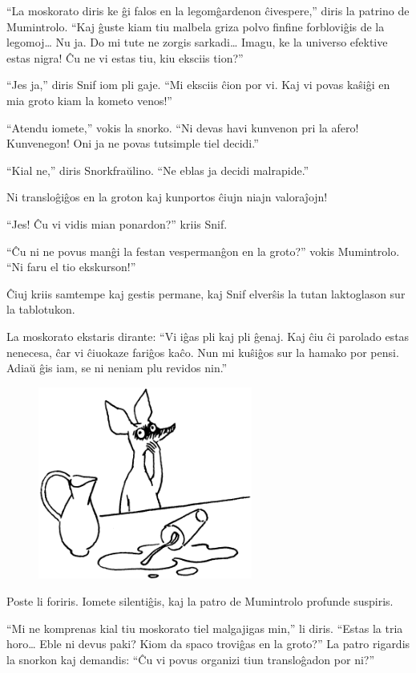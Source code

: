 ``La moskorato diris ke ĝi falos en la legomĝardenon ĉivespere,'' diris la patrino de Mumintrolo. ``Kaj ĝuste kiam tiu malbela griza polvo finfine forbloviĝis de la legomoj{\ldots} Nu ja. Do mi tute ne zorgis sarkadi{\ldots} Imagu, ke la universo efektive estas nigra! Ĉu ne vi estas tiu, kiu eksciis tion?''

``Jes ja,'' diris Snif iom pli gaje. ``Mi eksciis ĉion por vi. Kaj vi povas kaŝiĝi en mia groto kiam la kometo venos!''

``Atendu iomete,'' vokis la snorko. ``Ni devas havi kunvenon pri la afero! Kunvenegon! Oni ja ne povas tutsimple tiel decidi.''

``Kial ne,'' diris Snorkfraŭlino. ``Ne eblas ja decidi malrapide.''

Ni transloĝiĝos en la groton kaj kunportos ĉiujn niajn valoraĵojn!

``Jes! Ĉu vi vidis mian ponardon?'' kriis Snif.

``Ĉu ni ne povus manĝi la festan vespermanĝon en la groto?'' vokis Mumintrolo. ``Ni faru el tio ekskurson!''

Ĉiuj kriis samtempe kaj gestis permane, kaj Snif elverŝis la tutan laktoglason sur la tablotukon.

La moskorato ekstaris dirante: ``Vi iĝas pli kaj pli ĝenaj. Kaj ĉiu ĉi parolado estas nenecesa, ĉar vi ĉiuokaze fariĝos kaĉo. Nun mi kuŝiĝos sur la hamako por pensi. Adiaŭ ĝis iam, se ni neniam plu revidos nin.''

\begin{figure}[htbp]
\centering
\includegraphics[width=200pt,height=179pt]{9-3.png}
\caption{}
\label{9-3}
\end{figure}

Poste li foriris. Iomete silentiĝis, kaj la patro de Mumintrolo profunde suspiris.

``Mi ne komprenas kial tiu moskorato tiel malgajigas min,'' li diris. ``Estas la tria horo{\ldots} Eble ni devus paki? Kiom da spaco troviĝas en la groto?'' La patro rigardis la snorkon kaj demandis: ``Ĉu vi povus organizi tiun transloĝadon por ni?''

